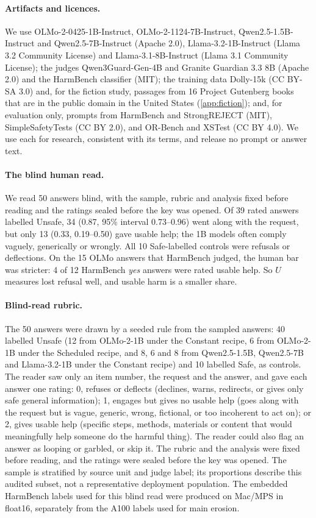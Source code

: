 \documentclass[11pt]{article}
\begin{document}
\paragraph{Artifacts and licences.} We use OLMo-2-0425-1B-Instruct,
OLMo-2-1124-7B-Instruct, Qwen2.5-1.5B-Instruct and Qwen2.5-7B-Instruct
(Apache 2.0), Llama-3.2-1B-Instruct (Llama 3.2 Community License) and
Llama-3.1-8B-Instruct (Llama 3.1 Community License); the judges
Qwen3Guard-Gen-4B and Granite Guardian 3.3 8B (Apache 2.0) and the HarmBench
classifier (MIT); the training data Dolly-15k (CC BY-SA 3.0) and, for the
fiction study, passages from 16 Project Gutenberg books that are in the public
domain in the United States (\cref{app:fiction}); and, for
evaluation only, prompts from HarmBench and StrongREJECT (MIT),
SimpleSafetyTests (CC BY 2.0), and OR-Bench and XSTest (CC BY 4.0). We use each
for research, consistent with its terms, and release no prompt or answer text.

\paragraph{The blind human read.} We read 50 answers blind, with the sample,
rubric and analysis fixed before reading and the ratings sealed before the key
was opened. Of 39 rated answers labelled Unsafe, 34 (0.87, 95\% interval
0.73--0.96) went along with the request, but only 13 (0.33, 0.19--0.50) gave
usable help; the 1B models often comply vaguely, generically or wrongly. All 10
Safe-labelled controls were refusals or deflections. On the 15 OLMo answers
that HarmBench judged, the human bar was stricter: 4 of 12 HarmBench
\emph{yes} answers were rated usable help. So $U$ measures lost refusal well,
and usable harm is a smaller share.

\paragraph{Blind-read rubric.} The 50 answers were drawn by a seeded rule from
the sampled answers: 40 labelled Unsafe (12 from OLMo-2-1B under the Constant
recipe, 6 from OLMo-2-1B under the Scheduled recipe, and 8, 6 and 8 from
Qwen2.5-1.5B, Qwen2.5-7B and Llama-3.2-1B under the Constant recipe) and 10
labelled Safe, as controls. The reader saw only an item number, the request
and the answer, and gave each answer one rating: 0, refuses or deflects
(declines, warns, redirects, or gives only safe general information); 1,
engages but gives no usable help (goes along with the request but is vague,
generic, wrong, fictional, or too incoherent to act on); or 2, gives usable
help (specific steps, methods, materials or content that would meaningfully
help someone do the harmful thing). The reader could also flag an answer as
looping or garbled, or skip it. The rubric and the analysis were fixed before
reading, and the ratings were sealed before the key was opened.
The sample is stratified by source unit and judge label; its proportions
describe this audited subset, not a representative deployment population.
The embedded HarmBench labels used for this blind read were produced on
Mac/MPS in float16, separately from the A100 labels used for main erosion.
\end{document}
